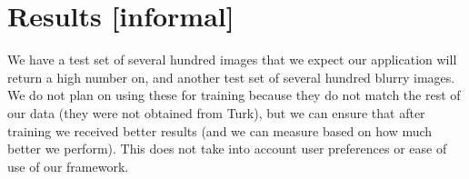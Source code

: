 \documentclass[10pt,twocolumn]{article}
\begin{document}
\section{Results [informal]}
We have a test set of several hundred images that we expect our application will return a high number on, and another test set of several hundred blurry images. We do not plan on using these for training because they do not match the rest of our data (they were not obtained from Turk), but we can ensure that after training we received better results (and we can measure based on how much better we perform). This does not take into account user preferences or ease of use of our framework.



\end{document}
